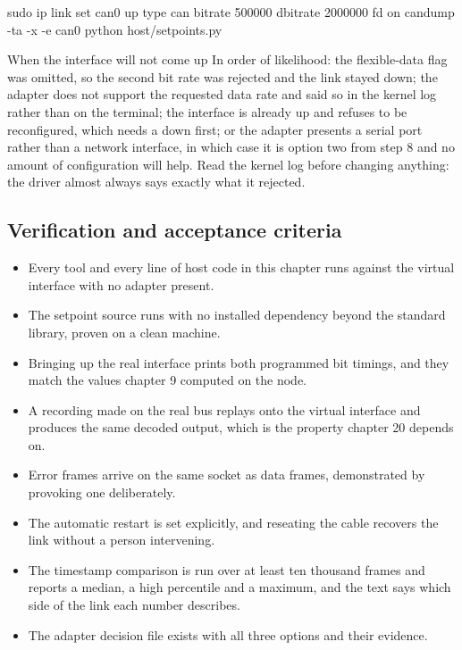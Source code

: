 \begin{shellcode}
sudo ip link set can0 up type can bitrate 500000 dbitrate 2000000 fd on
candump -ta -x -e can0
python host/setpoints.py
\end{shellcode}

\begin{note}{When the interface will not come up}
In order of likelihood: the flexible-data flag was omitted, so the second bit
rate was rejected and the link stayed down; the adapter does not support the
requested data rate and said so in the kernel log rather than on the terminal;
the interface is already up and refuses to be reconfigured, which needs a down
first; or the adapter presents a serial port rather than a network interface, in
which case it is option two from step 8 and no amount of configuration will
help. Read the kernel log before changing anything: the driver almost always
says exactly what it rejected.
\end{note}

\subsection*{Verification and acceptance criteria}

\begin{itemize}
\item Every tool and every line of host code in this chapter runs against the
virtual interface with no adapter present.
\item The setpoint source runs with no installed dependency beyond the standard
library, proven on a clean machine.
\item Bringing up the real interface prints both programmed bit timings, and
they match the values chapter 9 computed on the node.
\item A recording made on the real bus replays onto the virtual interface and
produces the same decoded output, which is the property chapter 20 depends on.
\item Error frames arrive on the same socket as data frames, demonstrated by
provoking one deliberately.
\item The automatic restart is set explicitly, and reseating the cable recovers
the link without a person intervening.
\item The timestamp comparison is run over at least ten thousand frames and
reports a median, a high percentile and a maximum, and the text says which side
of the link each number describes.
\item The adapter decision file exists with all three options and their
evidence.
\end{itemize}

